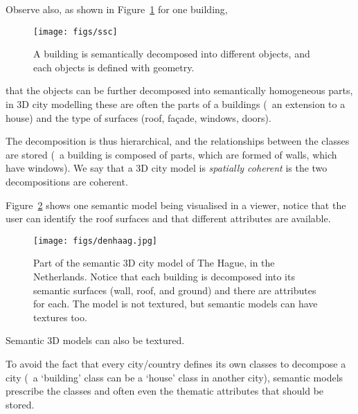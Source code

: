 %

Observe also, as shown in Figure~\ref{fig:ssc} for one building, 
\begin{figure}
  \centering
  \texttt{[image: figs/ssc]}
  \caption{A building is semantically decomposed into different objects, and each objects is defined with geometry.}%
\label{fig:ssc}
\end{figure}
that the objects can be further decomposed into semantically homogeneous parts, in 3D city modelling these are often the parts of a buildings (\eg\ an extension to a house) and the type of surfaces (roof, façade, windows, doors).

The decomposition is thus hierarchical, and the relationships between the classes are stored (\eg\ a building is composed of parts, which are formed of walls, which have windows). 
We say that a 3D city model is \emph{spatially coherent} is the two decompositions are coherent.

%

Figure~\ref{fig:denhaag} shows one semantic model being visualised in a viewer, notice that the user can identify the roof surfaces and that different attributes are available.
\begin{figure}
  \centering
  \texttt{[image: figs/denhaag.jpg]}
  \caption{Part of the semantic 3D city model of The Hague, in the Netherlands. Notice that each building is decomposed into its semantic surfaces (wall, roof, and ground) and there are attributes for each. The model is not textured, but semantic models can have textures too.}
\label{fig:denhaag}
\end{figure}
Semantic 3D models can also be textured.

%

To avoid the fact that every city/country defines its own classes to decompose a city (\eg\ a `building' class can be a `house' class in another city), semantic models prescribe the classes and often even the thematic attributes that should be stored.




